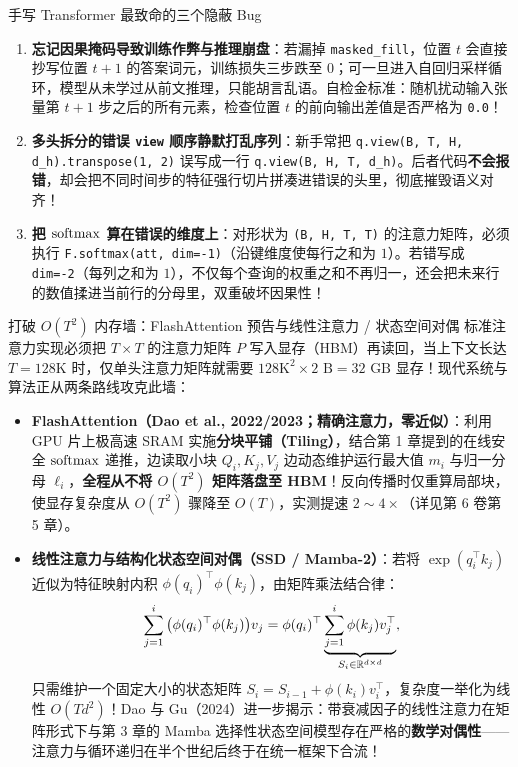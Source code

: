 \begin{failBox}{手写 Transformer 最致命的三个隐蔽 Bug}
\begin{enumerate}
  \item \textbf{忘记因果掩码导致训练作弊与推理崩盘}：若漏掉 \texttt{masked\_fill}，位置 $t$ 会直接抄写位置 $t+1$ 的答案词元，训练损失三步跌至 $0$；可一旦进入自回归采样循环，模型从未学过从前文推理，只能胡言乱语。自检金标准：随机扰动输入张量第 $t+1$ 步之后的所有元素，检查位置 $t$ 的前向输出差值是否严格为 \texttt{0.0}！
  \item \textbf{多头拆分的错误 \texttt{view} 顺序静默打乱序列}：新手常把 \texttt{q.view(B, T, H, d\_h).transpose(1, 2)} 误写成一行 \texttt{q.view(B, H, T, d\_h)}。后者代码\textbf{不会报错}，却会把不同时间步的特征强行切片拼凑进错误的头里，彻底摧毁语义对齐！
  \item \textbf{把 $\operatorname{softmax}$ 算在错误的维度上}：对形状为 \texttt{(B, H, T, T)} 的注意力矩阵，必须执行 \texttt{F.softmax(att, dim=-1)}（沿键维度使每行之和为 $1$）。若错写成 \texttt{dim=-2}（每列之和为 $1$），不仅每个查询的权重之和不再归一，还会把未来行的数值揉进当前行的分母里，双重破坏因果性！
\end{enumerate}
\end{failBox}

\begin{extBox}{打破 $O(T^2)$ 内存墙：FlashAttention 预告与线性注意力 / 状态空间对偶}
标准注意力实现必须把 $T \times T$ 的注意力矩阵 $P$ 写入显存（HBM）再读回，当上下文长达 $T = 128\text{K}$ 时，仅单头注意力矩阵就需要 $128\text{K}^2 \times 2\text{ B} = 32\text{ GB}$ 显存！现代系统与算法正从两条路线攻克此墙：
\begin{itemize}
  \item \textbf{FlashAttention（Dao et al., 2022/2023；精确注意力，零近似）}：利用 GPU 片上极高速 SRAM 实施\textbf{分块平铺（Tiling）}，结合第 1 章提到的在线安全 $\operatorname{softmax}$ 递推，边读取小块 $Q_i, K_j, V_j$ 边动态维护运行最大值 $m_i$ 与归一分母 $\ell_i$，\textbf{全程从不将 $O(T^2)$ 矩阵落盘至 HBM}！反向传播时仅重算局部块，使显存复杂度从 $O(T^2)$ 骤降至 $O(T)$，实测提速 $2\sim 4\times$（详见第 6 卷第 5 章）。
  \item \textbf{线性注意力与结构化状态空间对偶（SSD / Mamba-2）}：若将 $\exp(q_i^\top k_j)$ 近似为特征映射内积 $\phi(q_i)^\top \phi(k_j)$，由矩阵乘法结合律：
  \[
    \sum_{j=1}^i \big(\phi(q_i)^\top \phi(k_j)\big) v_j
    = \phi(q_i)^\top \underbrace{\sum_{j=1}^i \phi(k_j) v_j^\top}_{S_i \in \mathbb{R}^{d \times d}},
  \]
  只需维护一个固定大小的状态矩阵 $S_i = S_{i-1} + \phi(k_i) v_i^\top$，复杂度一举化为线性 $O(T d^2)$！Dao 与 Gu（2024）进一步揭示：带衰减因子的线性注意力在矩阵形式下与第 3 章的 Mamba 选择性状态空间模型存在严格的\textbf{数学对偶性}——注意力与循环递归在半个世纪后终于在统一框架下合流！
\end{itemize}
\end{extBox}

